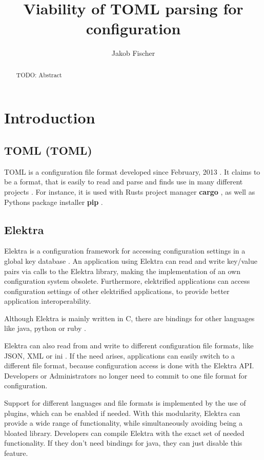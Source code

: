 \documentclass[12pt]{report}
\title{Viability of TOML parsing for configuration}
\author{Jakob Fischer}
\begin{document}
\maketitle

\begin{abstract}
TODO: Abstract
\end{abstract}

\chapter{Introduction}


\section{\acrshort{TOML} (\acrlong{TOML})}
\acrshort{TOML} is a configuration file format developed since February, 2013 \cite{tomlcontrib}.
It claims to be a format, that is easily to read and parse \cite{tomlreadme} and finds use in many different projects \cite{tomlwiki}.
For instance, it is used with Rusts project manager \textbf{cargo} \cite{cargogit}, as well as Pythons package installer \textbf{pip} \cite{piprefguide}.

\section{Elektra}
Elektra is a configuration framework for accessing configuration settings in a global key database \cite{elektramain}.
An application using Elektra can read and write key/value pairs via calls to the Elektra library, making the implementation of an own configuration system obsolete.
Furthermore, elektrified applications can access configuration settings of other elektrified applications, to provide better application interoperability.

Although Elektra is mainly written in C, there are bindings for other languages like java, python or ruby \cite{elektrabindings}.

Elektra can also read from and write to different configuration file formats, like JSON, XML or ini \cite{elektrastorage}.
If the need arises, applications can easily switch to a different file format, because configuration access is done with the Elektra API.
Developers or Administrators no longer need to commit to one file format for configuration.

Support for different languages and file formats is implemented by the use of plugins, which can be enabled if needed.
With this modularity, Elektra can provide a wide range of functionality, while simultaneously avoiding being a bloated library.
Developers can compile Elektra with the exact set of needed functionality. If they don't need bindings for java, they can just disable this feature.
\end{document}

